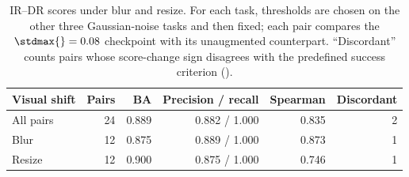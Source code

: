\begin{table}[t]
\centering
\caption{IR--DR scores under blur and resize. For each task, thresholds are chosen on the other three Gaussian-noise tasks and then fixed; each pair compares the $\stdmax{}=0.08$ checkpoint with its unaugmented counterpart. ``Discordant'' counts pairs whose score-change sign disagrees with the predefined success criterion ().}
\label{tab:cross-stressor-ir-dr-summary}
\small
\setlength{\tabcolsep}{4pt}
\begin{tabular}{lrrrrr}
\toprule
Visual shift & Pairs & BA & Precision / recall & Spearman & Discordant \\
\midrule
All pairs & 24 & 0.889 & 0.882 / 1.000 & 0.835 & 2 \\
Blur & 12 & 0.875 & 0.889 / 1.000 & 0.873 & 1 \\
Resize & 12 & 0.900 & 0.875 / 1.000 & 0.746 & 1 \\
\bottomrule
\end{tabular}
\end{table}
